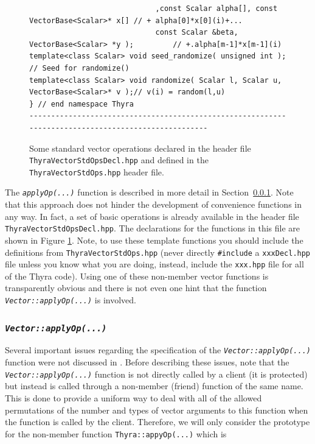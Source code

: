 \documentclass[pdf,ps2pdf,11pt]{SANDreport}
\begin{document}
{\begin{figure}[p]
\begin{minipage}{\textwidth}
{\begin{verbatim}
                             ,const Scalar alpha[], const VectorBase<Scalar>* x[] // + alpha[0]*x[0](i)+...
                             const Scalar &beta, VectorBase<Scalar> *y );         // +.alpha[m-1]*x[m-1](i)
template<class Scalar> void seed_randomize( unsigned int );                   // Seed for randomize()
template<class Scalar> void randomize( Scalar l, Scalar u, VectorBase<Scalar>* v );// v(i) = random(l,u)
} // end namespace Thyra
----------------------------------------------------------------------------------------------------
\end{verbatim}}
\end{minipage}
\caption{
\label{tsfcore:fig:std_vec_ops}
Some standard vector operations declared in the header file
{}\texttt{Thyra\-Vector\-Std\-Ops\-Decl.hpp} and defined in the
{}\texttt{Thyra\-Vector\-Std\-Ops.hpp} header file. 
}
\end{figure}
\esinglespace}

The {}\texttt{\textit{applyOp(\-...)}}  function is described in more detail
in Section~\ref{tsfcore:sec:vec_apply_op}.  Note that this approach does not
hinder the development of convenience functions in any way.  In fact, a set of
basic operations is already available in the header file
{}\texttt{Thyra\-Vector\-Std\-Ops\-Decl.hpp}.  The declarations for the
functions in this file are shown in Figure {}\ref{tsfcore:fig:std_vec_ops}.
Note, to use these template functions you should include the definitions from
{}\texttt{Thyra\-Vector\-Std\-Ops.hpp} (never directly {}\texttt{\#include} a
{}\texttt{xxxDecl.hpp} file unless you know what you are doing, instead,
include the {}\texttt{xxx.hpp} file for all of the Thyra code).  Using one of
these non-member vector functions is transparently obvious and there is not
even one hint that the function {}\texttt{\textit{Vector::applyOp(\-...)}} is
involved.

%
\subsubsection{\texttt{\textit{Vector::applyOp(\-...)}}}
\label{tsfcore:sec:vec_apply_op}
%

Several important issues regarding the specification of the
{}\texttt{\textit{Vector::applyOp(\-...)}} function were not discussed
in {}\cite{ref:rtop_toms}.  Before describing these issues, note that
the {}\texttt{\textit{Vector\-::applyOp(\-...)}} function is not
directly called by a client (it is protected) but instead is called
through a non-member (friend) function of the same name.  This is done
to provide a uniform way to deal with all of the allowed permutations
of the number and types of vector arguments to this function when the
function is called by the client.  Therefore, we will only consider
the prototype for the non-member function
{}\texttt{Thyra::appyOp(...)}  which is
\end{document}
